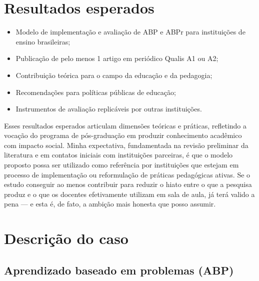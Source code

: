 
\section{Resultados esperados}
\label{sec:resultados_esperados}

\begin{itemize}
    \item Modelo de implementação e avaliação de ABP e ABPr para instituições de ensino brasileiras;
    \item Publicação de pelo menos 1 artigo em periódico Qualis A1 ou A2;
    \item Contribuição teórica para o campo da educação e da pedagogia;
    \item Recomendações para políticas públicas de educação;
    \item Instrumentos de avaliação replicáveis por outras instituições.
\end{itemize}

Esses resultados esperados articulam dimensões teóricas e práticas, refletindo a vocação do programa de pós-graduação em produzir conhecimento acadêmico com impacto social. Minha expectativa, fundamentada na revisão preliminar da literatura e em contatos iniciais com instituições parceiras, é que o modelo proposto possa ser utilizado como referência por instituições que estejam em processo de implementação ou reformulação de práticas pedagógicas ativas. Se o estudo conseguir ao menos contribuir para reduzir o hiato entre o que a pesquisa produz e o que os docentes efetivamente utilizam em sala de aula, já terá valido a pena — e esta é, de fato, a ambição mais honesta que posso assumir.


\section{Descrição do caso}
\label{sec:descricao_caso}

\subsection{Aprendizado baseado em problemas (ABP)}
\label{subsec:abp_descricao}

